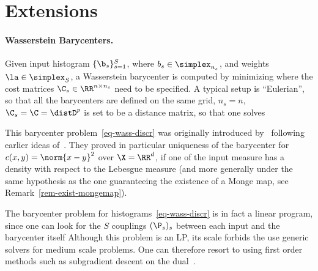 \section{Extensions}


\paragraph{Wasserstein Barycenters.}

Given input histogram $\{\b_s\}_{s=1}^S$, where $b_s \in \simplex_{n_s}$, and weights $\la \in \simplex_S$, a Wasserstein barycenter is computed by minimizing
where the cost matrices $\C_s \in \RR^{n \times n_s}$ need to be specified. 
%
A typical setup is ``Eulerian'', so that all the barycenters are defined on the same grid, $n_s=n$, $\C_s=\C=\distD^p$ is set to be a distance matrix, so that one solves

This barycenter problem~\eqref{eq-wass-discr} was originally introduced by~\cite{Carlier_wasserstein_barycenter} following earlier ideas of~\cite{carlierekelandmatching}. They proved in particular uniqueness of the barycenter for $c(x,y)=\norm{x-y}^2$ over $\X=\RR^d$, if one of the input measure has a density with respect to the Lebesgue measure (and more generally under the same hypothesis as the one guaranteeing the existence of a Monge map, see Remark~\ref{rem-exist-mongemap}).

The barycenter problem for histograms~\eqref{eq-wass-discr} is in fact a linear program, since one can look for the $S$ couplings $(\P_s)_s$ between each input and the barycenter itself
Although this problem is an LP, its scale forbids the use generic solvers for medium scale problems. One can therefore resort to using first order methods such as subgradient descent on the dual~\cite{Carlier-NumericsBarycenters}.

